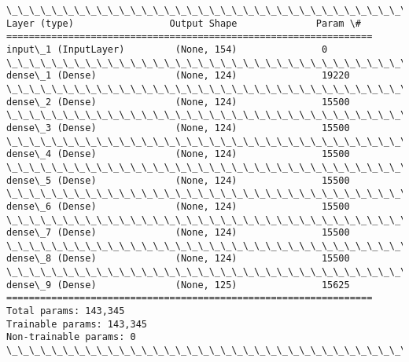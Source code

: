 \documentclass[11pt]{article}
\begin{document}
    \begin{Verbatim}[commandchars=\\\{\}]
\_\_\_\_\_\_\_\_\_\_\_\_\_\_\_\_\_\_\_\_\_\_\_\_\_\_\_\_\_\_\_\_\_\_\_\_\_\_\_\_\_\_\_\_\_\_\_\_\_\_\_\_\_\_\_\_\_\_\_\_\_\_\_\_\_
Layer (type)                 Output Shape              Param \#   
=================================================================
input\_1 (InputLayer)         (None, 154)               0         
\_\_\_\_\_\_\_\_\_\_\_\_\_\_\_\_\_\_\_\_\_\_\_\_\_\_\_\_\_\_\_\_\_\_\_\_\_\_\_\_\_\_\_\_\_\_\_\_\_\_\_\_\_\_\_\_\_\_\_\_\_\_\_\_\_
dense\_1 (Dense)              (None, 124)               19220     
\_\_\_\_\_\_\_\_\_\_\_\_\_\_\_\_\_\_\_\_\_\_\_\_\_\_\_\_\_\_\_\_\_\_\_\_\_\_\_\_\_\_\_\_\_\_\_\_\_\_\_\_\_\_\_\_\_\_\_\_\_\_\_\_\_
dense\_2 (Dense)              (None, 124)               15500     
\_\_\_\_\_\_\_\_\_\_\_\_\_\_\_\_\_\_\_\_\_\_\_\_\_\_\_\_\_\_\_\_\_\_\_\_\_\_\_\_\_\_\_\_\_\_\_\_\_\_\_\_\_\_\_\_\_\_\_\_\_\_\_\_\_
dense\_3 (Dense)              (None, 124)               15500     
\_\_\_\_\_\_\_\_\_\_\_\_\_\_\_\_\_\_\_\_\_\_\_\_\_\_\_\_\_\_\_\_\_\_\_\_\_\_\_\_\_\_\_\_\_\_\_\_\_\_\_\_\_\_\_\_\_\_\_\_\_\_\_\_\_
dense\_4 (Dense)              (None, 124)               15500     
\_\_\_\_\_\_\_\_\_\_\_\_\_\_\_\_\_\_\_\_\_\_\_\_\_\_\_\_\_\_\_\_\_\_\_\_\_\_\_\_\_\_\_\_\_\_\_\_\_\_\_\_\_\_\_\_\_\_\_\_\_\_\_\_\_
dense\_5 (Dense)              (None, 124)               15500     
\_\_\_\_\_\_\_\_\_\_\_\_\_\_\_\_\_\_\_\_\_\_\_\_\_\_\_\_\_\_\_\_\_\_\_\_\_\_\_\_\_\_\_\_\_\_\_\_\_\_\_\_\_\_\_\_\_\_\_\_\_\_\_\_\_
dense\_6 (Dense)              (None, 124)               15500     
\_\_\_\_\_\_\_\_\_\_\_\_\_\_\_\_\_\_\_\_\_\_\_\_\_\_\_\_\_\_\_\_\_\_\_\_\_\_\_\_\_\_\_\_\_\_\_\_\_\_\_\_\_\_\_\_\_\_\_\_\_\_\_\_\_
dense\_7 (Dense)              (None, 124)               15500     
\_\_\_\_\_\_\_\_\_\_\_\_\_\_\_\_\_\_\_\_\_\_\_\_\_\_\_\_\_\_\_\_\_\_\_\_\_\_\_\_\_\_\_\_\_\_\_\_\_\_\_\_\_\_\_\_\_\_\_\_\_\_\_\_\_
dense\_8 (Dense)              (None, 124)               15500     
\_\_\_\_\_\_\_\_\_\_\_\_\_\_\_\_\_\_\_\_\_\_\_\_\_\_\_\_\_\_\_\_\_\_\_\_\_\_\_\_\_\_\_\_\_\_\_\_\_\_\_\_\_\_\_\_\_\_\_\_\_\_\_\_\_
dense\_9 (Dense)              (None, 125)               15625     
=================================================================
Total params: 143,345
Trainable params: 143,345
Non-trainable params: 0
\_\_\_\_\_\_\_\_\_\_\_\_\_\_\_\_\_\_\_\_\_\_\_\_\_\_\_\_\_\_\_\_\_\_\_\_\_\_\_\_\_\_\_\_\_\_\_\_\_\_\_\_\_\_\_\_\_\_\_\_\_\_\_\_\_

    \end{Verbatim}
\end{document}
